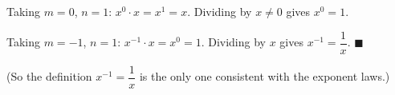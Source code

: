 Taking $m=0$, $n=1$: $x^0\cdot x=x^{1}=x$. Dividing by $x\ne0$ gives $x^0=1$.

Taking $m=-1$, $n=1$: $x^{-1}\cdot x=x^0=1$. Dividing by $x$ gives $x^{-1}=\dfrac1x$. $\blacksquare$

(So the definition $x^{-1}=\dfrac1x$ is the only one consistent with the exponent laws.)
